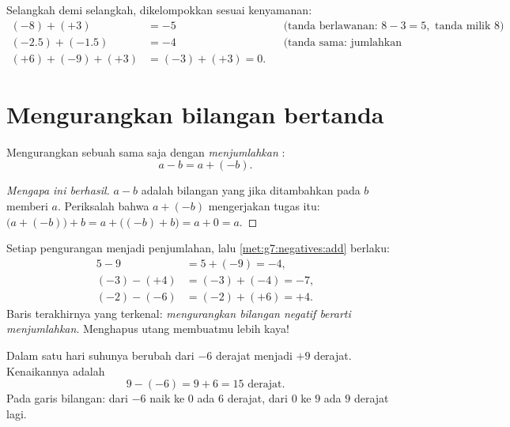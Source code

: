 \begin{example}\label{ex:g7:negatives:add}
Selangkah demi selangkah, dikelompokkan sesuai kenyamanan:
\begin{align*}
(-8) + (+3) &= -5 && \text{(tanda berlawanan: } 8 - 3 = 5,
\text{ tanda milik } 8)\\
(-2.5) + (-1.5) &= -4 && \text{(tanda sama: jumlahkan jaraknya)}\\
(+6) + (-9) + (+3) &= (-3) + (+3) = 0 .
\end{align*}
\end{example}

\section{Mengurangkan bilangan bertanda}

\begin{theorem}\label{thm:g7:negatives:sub}
Mengurangkan sebuah  sama saja dengan
\emph{menjumlahkan }:
\[
a - b = a + (-b) .
\]
\end{theorem}

\begin{proof}[Mengapa ini berhasil]
$a - b$ adalah bilangan yang jika ditambahkan pada $b$ memberi $a$.
Periksalah bahwa $a + (-b)$ mengerjakan tugas itu:
$\bigl(a + (-b)\bigr) + b = a + \bigl((-b) + b\bigr) = a + 0 = a$.
\end{proof}

\begin{example}\label{ex:g7:negatives:sub}
Setiap pengurangan menjadi penjumlahan, lalu
\cref{met:g7:negatives:add} berlaku:
\begin{align*}
5 - 9 &= 5 + (-9) = -4, \\
(-3) - (+4) &= (-3) + (-4) = -7, \\
(-2) - (-6) &= (-2) + (+6) = +4 .
\end{align*}
Baris terakhirnya yang terkenal: \emph{mengurangkan bilangan negatif
berarti menjumlahkan}. Menghapus utang membuatmu lebih kaya!
\end{example}

\begin{example}\label{ex:g7:negatives:temperature}
Dalam satu hari suhunya berubah dari $-6$ derajat menjadi $+9$
derajat. Kenaikannya adalah 
\[
9 - (-6) = 9 + 6 = 15 \text{ derajat}.
\]
Pada garis bilangan: dari $-6$ naik ke $0$ ada $6$ derajat, dari $0$
ke $9$ ada $9$ derajat lagi.
\end{example}

